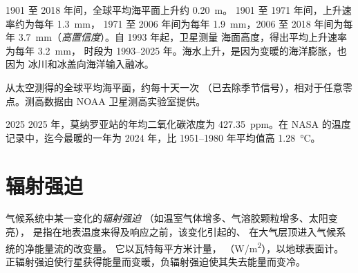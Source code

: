 \begin{proposition}[海平面上升越来越快]\label{prop:g12:climate-change:sea}
1901 至 2018 年间，全球平均海平面上升约 \qty{0.20}{m}。
1901 至 1971 年间，上升速率约为每年 \qty{1.3}{mm}，
1971 至 2006 年间为每年 \qty{1.9}{mm}，2006 至
2018 年间为每年 \qty{3.7}{mm}（\emph{高置信度}）。自 1993 年起，卫星测量
海面高度，得出平均上升速率为每年 \qty{3.2}{mm}，
时段为 1993--2025 年。海水上升，是因为变暖的海洋膨胀，也因为
冰川和冰盖向海洋输入融冰。
\end{proposition}

\begin{omfigure}

{\small 从太空测得的全球平均海平面，约每十天一次
（已去除季节信号），相对于任意零点。测高数据由
NOAA 卫星测高实验室提供。}
\end{omfigure}

\begin{dated}{2025}
2025 年，莫纳罗亚站的年均二氧化碳浓度为
\qty{427.35}{ppm}。在 NASA 的温度记录中，迄今最暖的一年为
2024 年，比 1951--1980 年平均值高 \qty{1.28}{\degreeCelsius}。
\end{dated}

\section{辐射强迫}

\begin{definition}[辐射强迫]\label{def:g12:climate-change:forcing}
气候系统中某一变化的\emph{辐射强迫}
（如温室气体增多、气溶胶颗粒增多、太阳变亮），
是指在地表温度来得及响应之前，该变化引起的、
在大气层顶进入气候系统的净能量流的改变量。
它以瓦特每平方米计量，
（\unit{W/m^2}），以地球表面计。
正辐射强迫使行星获得能量而变暖，负辐射强迫使其失去能量而变冷。
\end{definition}

